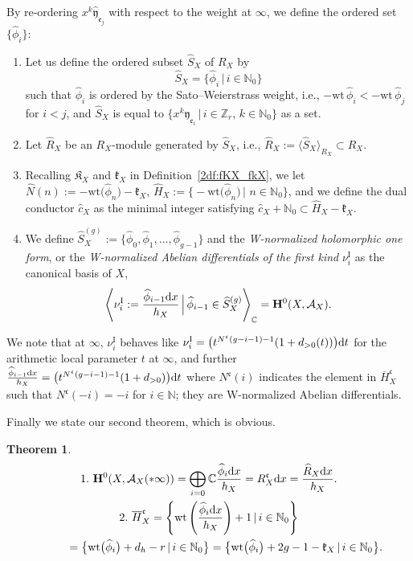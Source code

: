 \documentclass[10pt,a4paper]{amsart}
\def\CC{{\mathbb C}}
\def\ZZ{{\mathbb Z}}
\def\NN{{\mathbb N}}
\def\bH{{\mathbf F}}
\def\bH{{\mathbf H}}
\def\cA{{\mathcal A}}
\def\fK{{\mathfrak K}}
\def\fc{{\mathfrak c}}
\def\fe{{\mathfrak e}}
\def\fk{{\mathfrak k}}
\def\BH{{\overline H}}
\def\hc{{\widehat c}}
\def\hH{{\widehat H}}
\def\hN{{\widehat N}}
\def\hR{{\widehat R}}
\def\hS{{\widehat S}}
\def\hfy{{\widehat{\mathfrak y}}}
\def\hphi{{\widehat \phi}}
\def\wt{{\mathrm {wt}}}
\def\nuI#1{{\nu^{\mathrm{I}}_{#1}}}
\numberwithin{equation}{section}
\newtheorem{Theorem}{Theorem}[section]
\begin{document}
By re-ordering $x^k\hfy_{\fe_j}$ with respect to the weight at $\infty$, we define the ordered set $\big\{\hphi_i\big\}$:

\begin{Definition}\label{2df:nuI_hX}\quad
\begin{enumerate}\itemsep=0pt
\item
Let us define the ordered subset
$\hS_X$ of $R_X$ by
\[
\hS_X=\big\{\hphi_i\, | \, i \in \NN_0\big\}
\]
such that $\hphi_i$ is ordered by the Sato--Weierstrass weight,
i.e., $-\wt \,\hphi_i < -\wt\, \hphi_j$ for $i < j$,
and
$\hS_X$ is equal to $\big\{x ^k \hfy_{\fe_i} \, |\,i \in \ZZ_r,\, k \in \NN_0\big\}$ as a set.

\item Let $\hR_X$ be an $R_X$-module generated by $\hS_X$, i.e., $\hR_X:=\langle \hS_X\rangle_{R_X} \subset R_X$.

\item Recalling $\fK_X$ and $\fk_X$ in Definition~\ref{2df:fKX_fkX}, we let $\hN(n):= -\wt \big(\hphi_n\big)-\fk_X$, $\hH_X:=\big\{{-}\wt \big(\hphi_n\big)\, |$ $n \in \NN_0\big\}$, and we define the dual conductor $\hc_X$ as the minimal integer satisfying $\hc_X + \NN_0 \subset \hH_X-\fk_X$.

\item We define $\hS_X^{(g)}:=\big\{\hphi_0, \hphi_1, \dots, \hphi_{g-1}\big\}$ and the \emph{W-normalized holomorphic one form}, or the \emph{W-normalized Abelian differentials of the first kind} $\nuI{i}$ as the canonical basis of $X$,
\begin{equation}
\left\langle\nuI{i} := \frac{\hphi_{i-1} {\rm d} x }{h_X}\,\Bigr|\,
\hphi_{i-1} \in \hS_X^{(g)}\right\rangle_\CC = \bH^0(X, \cA_X).\label{2eq:nuI_hX}
\end{equation}
\end{enumerate}
\end{Definition}

We note that at $\infty$, $\nuI{i}$ behaves like
$
\nuI{i}=\big(t^{N^\fc(g-i-1)-1} (1+ d_{>0}(t))\big) {\rm d} t$ for the arithmetic local parameter $t$ at $\infty$, and further
$\frac{\hphi_{i-1} {\rm d} x }{h_X}=
\big(t^{N^\fc(g-i-1)-1}(1+d_{>0})\big){\rm d}t$ where $N^\fc(i)$ indicates the element in $\BH_X^\fc$ such that $N^\fc(-i)=-i$ for $i \in \NN$; they are W-normalized Abelian differentials.

Finally we state our second theorem, which is obvious.

\begin{Theorem}\label{2lm:nuI_hX}\quad
\begin{gather*}
1. \ \bH^0(X, \cA_X(*\infty)) = \bigoplus_{i=0} \CC\frac{\hphi_i {\rm d} x}{h_X}=R_X^\fc {\rm d} x = \frac{\hR_X {\rm d} x}{h_X}.\\
2. \
{\overline H}_X^{\mathfrak c}=\left\{ \wt\left(\frac{\hphi_i {\rm d} x}{h_X}\right)+1 \, |\,i \in \NN_0\right\}
\\
\hphantom{2. \ {\overline H}_X^{\mathfrak c}}{}
 =\big\{ \wt\big(\hphi_i\big)+d_h -r \, |\,i \in \NN_0\big\} =\big\{ \wt\big(\hphi_i\big)+2g-1 -\fk_X \, |\,i \in \NN_0\big\}.
\end{gather*}
\end{Theorem}
\end{document}
